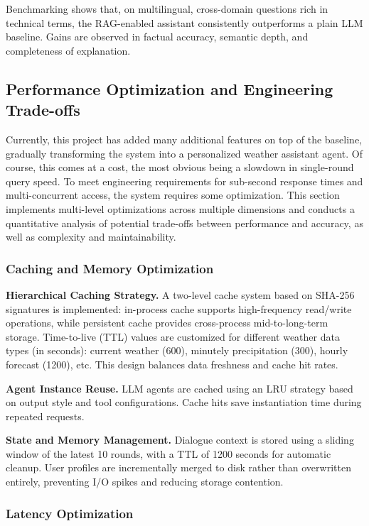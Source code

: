 \documentclass[final-report]{report-template}
\begin{document}
Benchmarking shows that, on multilingual, cross-domain questions rich in technical terms, the RAG-enabled assistant consistently outperforms a plain LLM baseline. Gains are observed in factual accuracy, semantic depth, and completeness of explanation.


\subsection{Performance Optimization and Engineering Trade-offs}

Currently, this project has added many additional features on top of the baseline, gradually transforming the system into a personalized weather assistant agent. Of course, this comes at a cost, the most obvious being a slowdown in single-round query speed. To meet engineering requirements for sub-second response times and multi-concurrent access, the system requires some optimization. This section implements multi-level optimizations across multiple dimensions and conducts a quantitative analysis of potential trade-offs between performance and accuracy, as well as complexity and maintainability.


\subsubsection{Caching and Memory Optimization}

\textbf{Hierarchical Caching Strategy.}
A two-level cache system based on SHA-256 signatures is implemented: in-process cache supports high-frequency read/write operations, while persistent cache provides cross-process mid-to-long-term storage. Time-to-live (TTL) values are customized for different weather data types (in seconds): current weather (600), minutely precipitation (300), hourly forecast (1200), etc. This design balances data freshness and cache hit rates.

\textbf{Agent Instance Reuse.}
LLM agents are cached using an LRU strategy based on output style and tool configurations. Cache hits save instantiation time during repeated requests.

\textbf{State and Memory Management.}
Dialogue context is stored using a sliding window of the latest 10 rounds, with a TTL of 1200 seconds for automatic cleanup. User profiles are incrementally merged to disk rather than overwritten entirely, preventing I/O spikes and reducing storage contention.

\subsubsection{Latency Optimization}
\end{document}

